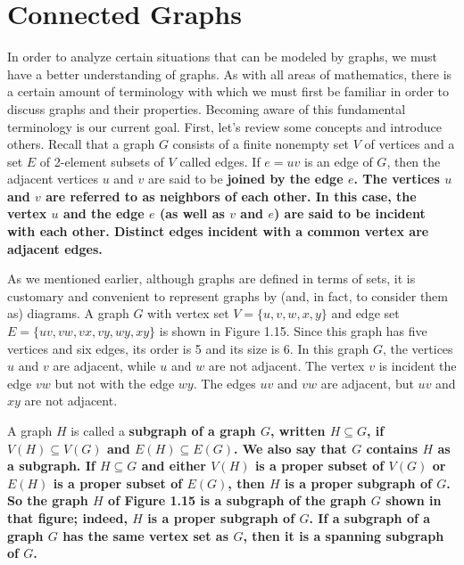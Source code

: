\section{Connected Graphs}
In order to analyze certain situations that can be modeled by graphs, we must have a better understanding of graphs. As with all areas of mathematics, there is a certain amount of terminology with which we must first be familiar in order to discuss graphs and their properties. Becoming aware of this fundamental terminology is our current goal. First, let's review some concepts and introduce others. Recall that a graph $G$ consists of a finite nonempty set $V$ of vertices and a set $E$ of 2-element subsets of $V$ called edges. If $e = uv$ is an edge of $G$, then the adjacent vertices $u$ and $v$ are said to be \bf{joined} by the edge $e$. The vertices $u$ and $v$ are referred to as \bf{neighbors} of each other. In this case, the vertex $u$ and the edge $e$ (as well as $v$ and $e$) are said to be \bf{incident} with each other. Distinct edges incident with a common vertex are \bf{adjacent edges}.

As we mentioned earlier, although graphs are defined in terms of sets, it is customary and convenient to represent graphs by (and, in fact, to consider them as) diagrams. A graph $G$ with vertex set $V = \{u,v,w,x,y\}$ and edge set $E = \{uv,vw,vx,vy,wy,xy\}$ is shown in Figure 1.15. Since this graph has five vertices and six edges, its order is 5 and its size is 6. In this graph $G$, the vertices $u$ and $v$ are adjacent, while $u$ and $w$ are not adjacent. The vertex $v$ is incident the edge $vw$ but not with the edge $wy$. The edges $uv$ and $vw$ are adjacent, but $uv$ and $xy$ are not adjacent.



A graph $H$ is called a \bf{subgraph} of a graph $G$, written $H \subseteq G$, if $V(H) \subseteq V(G)$ and $E(H) \subseteq E(G)$. We also say that $G$ contains $H$ as a subgraph. If $H \subseteq G$ and either $V(H)$ is a proper subset of $V(G)$ or $E(H)$ is a proper subset of $E(G)$, then $H$ is a \bf{proper subgraph} of $G$. So the graph $H$ of Figure 1.15 is a subgraph of the graph $G$ shown in that figure; indeed, $H$ is a proper subgraph of $G$. If a subgraph of a graph $G$ has the same vertex set as $G$, then it is a \bf{spanning subgraph} of $G$.

